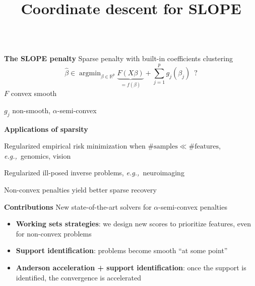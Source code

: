 \documentclass[english,final,t]{beamer}
\title{
	Coordinate descent for SLOPE}
\author{%
\texorpdfstring{
	\begin{minipage}{.7\linewidth}
	\begin{columns}%
		\column{.3\linewidth}
		\centering
		\Large Johan Larsson \\
		\large Mila \& Université de Montréal
		\column{.3\linewidth}
		\centering
		\Large Quentin Klopfenstein \\
		\large Université du Luxembourg
		\column{.28\linewidth}
		\centering
		\Large Mathurin Massias \\
		\large Univ. Lyon, Inria, CNRS, ENS de Lyon
		\centering
		\Large Jonas Wallin \\
		\large Univ. Lyon, Inria, CNRS, ENS de Lyon
	\end{columns}
	\vspace{1em}
\end{minipage}}{}
}
\newcommand{\bbR}{\mathbb{R}}
\newcommand{\eg}{{\em e.g.,~}}
\DeclareMathOperator*{\argmin}{argmin}
\begin{document}
\begin{frame}{}
\begin{columns}[t]
	\begin{column}{.3\linewidth}
		\begin{block}{\textbf{\color{malgared} The SLOPE penalty}}
			\justifying
			Sparse penalty with built-in coefficients clustering
	\begin{equation*}
        \hat
        \beta
        \in
        \argmin_{\beta \in \bbR^p}
        \underbrace{F(X\beta)}_{
			= f(\beta)}
        + \sum_{j=1}^p g_j(\beta_j)
        \enspace ?
    \end{equation*}
       $F$ convex smooth

	   $g_j$ non-smooth, $\alpha$-semi-convex
	\vspace{1em}

	\textbf{\color{malgared} Applications of sparsity}

	Regularized empirical risk minimization when
		$\# \text{samples} \ll \# \text{features}$, \eg genomics, vision

		Regularized ill-posed inverse problems, \eg neuroimaging

	\vspace{2em}

		\begin{center}
		\end{center}
		Non-convex penalties yield {\color{malgared} better sparse recovery}
	\end{block}
	\begin{block}{\textbf{\color{malgared} Contributions}}
			New state-of-the-art solvers for
			$\alpha$-semi-convex penalties
			\begin{itemize}
				\item  \textbf{\color{malgared}Working sets strategies}: we design new scores to prioritize features, even for non-convex problems
				\item  \textbf{\color{malgared}Support identification}: problems become smooth ``at some point''
				\item  \textbf{\color{malgared}Anderson acceleration + support identification}: once the support is identified, the convergence is accelerated
			\end{itemize}
	\end{block}


\end{column}
\end{columns}
\end{frame}
\end{document}
